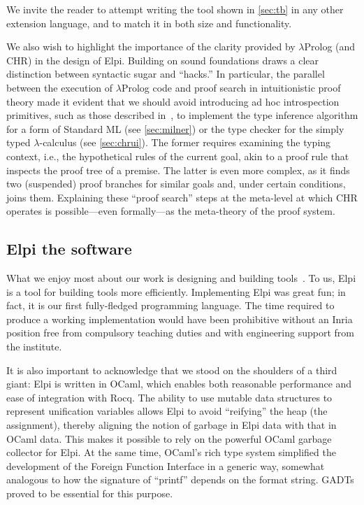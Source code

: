 \documentclass[a4paper, 11pt]{book}
\begin{document}
We invite the reader to attempt writing the  tool shown in
\cref{sec:tb} in any other extension language, and to match it in both
size and functionality.

We also wish to highlight the importance of the clarity provided by
$\lambda$Prolog (and CHR) in the design of Elpi. Building on sound foundations
draws a clear distinction between syntactic sugar and ``hacks.'' In particular,
the parallel between the execution of $\lambda$Prolog code and proof search in
intuitionistic proof theory made it evident that we should avoid introducing ad
hoc introspection primitives, such as those described in~\cite[Section 8 and
later]{10.1145/3236788}, to implement the type inference algorithm for a form
of Standard ML (see \cref{sec:milner}) or the type checker for the
simply typed $\lambda$-calculus (see \cref{sec:chrui}). The former
requires examining the typing context, i.e., the hypothetical rules of the
current goal, akin to a proof rule that inspects the proof tree of a premise.
The latter is even more complex, as it finds two (suspended) proof branches for
similar goals and, under certain conditions, joins them. Explaining these
``proof search'' steps at the meta-level at which CHR operates is possible—even
formally—as the meta-theory of the proof system.


\subsection{Elpi the software}


What we enjoy most about our work is designing and building tools~\cite{DBLP:journals/jar/AspertiCTZ07,gonthier:inria-00258384,Coq-refman}.
To us, Elpi is a tool for building tools more efficiently. Implementing Elpi was great fun; in fact, it is our first fully-fledged programming language. The time required to produce a working implementation would have been prohibitive without an Inria position free from compulsory teaching duties and with engineering support from the institute. %

It is also important to acknowledge that we stood on the shoulders of a third giant: Elpi is written in OCaml, which enables both reasonable performance and ease of integration with Rocq. The ability to use mutable data structures to represent unification variables allows Elpi to avoid ``reifying'' the heap (the assignment), thereby aligning the notion of garbage in Elpi data with that in OCaml data. This makes it possible to rely on the powerful OCaml garbage collector for Elpi. At the same time, OCaml's rich type system simplified the development of the Foreign Function Interface in a generic way, somewhat analogous to how the signature of ``printf'' depends on the format string. GADTs proved to be essential for this purpose.
\end{document}
